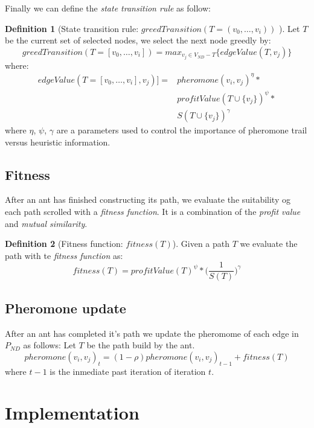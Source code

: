 \documentclass[letter,10pt]{article}
\theoremstyle{definition}
\newtheorem{definition}{Definition}[section]
\begin{document}
Finally we can define the \textit{state transition rule} as follow:

\begin{definition}[State transition rule: $greedTransition(T=(v_0, \dots, v_i))$ ] 
Let $T$ be the current set of selected nodes, we select the next node greedly by:
    \[
        greedTransition(T =[v_0, \dots, v_i] ) = max_{v_j \in V_{ND}-T} \big \{ edgeValue( T, v_j)\big \}
    \]
    where:
\begin{align*}
        edgeValue(T=[v_0,\dots,v_i], v_j) ]= &pheromone(v_i, v_j)^\eta * \\
        &profitValue(T\cup \{v_j\})^\psi *\\
        &S(T\cup \{v_j\})^\gamma
    \end{align*}
    where $\eta$, $\psi$, $\gamma$ are a parameters used to control the importance of pheromone trail versus heuristic information.
\end{definition}

\subsection{Fitness}

After an ant has finished constructing its path, we evaluate the suitability og each path scrolled with a \textit{fitness function}. It is a combination of the \textit{profit value} and \textit{mutual similarity}.

\begin{definition}[Fitness function: $fitness( T )$] Given a path $T$ we evaluate the path with te \textit{fitness function } as:
\[
    fitness(T) = profitValue(T)^\psi * \Big (\frac{1}{S(T)} \Big )^\gamma
\]
    
\end{definition}

\subsection{Pheromone update}

After an ant has completed it's path we update the pheromome of each edge in $P_{ND}$ as follows:
Let $T$ be the path build by the ant.
\[
    pheromone(v_i,v_j)_t = (1-\rho) pheromone(v_i,v_j)_{t-1} + fitness(T)
\]
where $t-1$ is the inmediate past iteration of iteration $t$.
    
\newpage


\section{Implementation}
\end{document}

